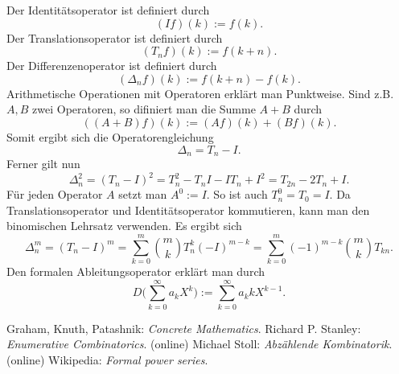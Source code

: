 \documentclass[a4paper,12pt,fleqn]{article}
\begin{document}
Der Identitätsoperator ist definiert durch
\[(If)(k) := f(k).\]
Der Translationsoperator ist definiert durch
\[(T_n f)(k) := f(k+n).\]
Der Differenzenoperator ist definiert durch
\[(\Delta_n f)(k) := f(k+n)-f(k).\]
Arithmetische Operationen mit Operatoren erklärt man Punktweise.
Sind z.B. $A,B$ zwei Operatoren, so difiniert man die Summe $A+B$
durch
\[((A+B)f)(k):=(A f)(k)+(B f)(k).\]
Somit ergibt sich die Operatorengleichung
\[\Delta_n = T_n-I.\]
Ferner gilt nun
\[\Delta_n^2 = (T_n-I)^2
= T_n^2-T_nI-IT_n+I^2
= T_{2n}-2T_n+I.\]
Für jeden Operator $A$ setzt man $A^0:=I$. So ist auch $T_n^0=T_0=I$.
Da Translationsoperator und Identitätsoperator kommutieren, kann
man den binomischen Lehrsatz verwenden. Es ergibt sich
\[\Delta_n^m = (T_n-I)^m
= \sum_{k=0}^m \binom{m}{k} T_n^k (-I)^{m-k}
= \sum_{k=0}^m (-1)^{m-k}\binom{m}{k} T_{kn}.\]
Den formalen Ableitungsoperator erklärt man durch
\[D\Big(\sum_{k=0}^\infty a_kX^k\Big)
:= \sum_{k=0}^\infty a_k kX^{k-1}.\]


\begin{thebibliography}{10}
\setlength{\itemsep}{0pt}
 Graham, Knuth, Patashnik: \textit{Concrete Mathematics}.
 Richard P. Stanley: \textit{Enumerative Combinatorics}. (online)
 Michael Stoll: \textit{Abzählende Kombinatorik}. (online)
 Wikipedia: \textit{Formal power series}.
\end{thebibliography}
\end{document}
